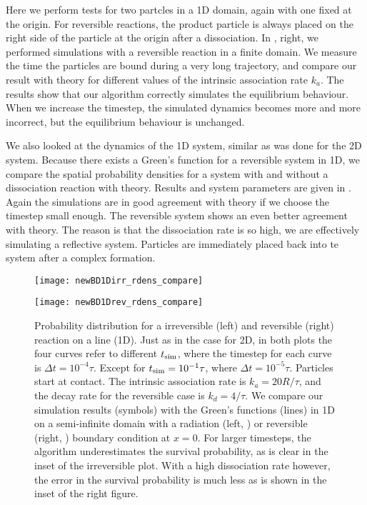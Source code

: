Here we perform tests for two partcles in a 1D domain, again with one fixed at the origin. For reversible reactions, the product particle is always placed on the right side of the particle at the origin after a dissociation. In , right, we performed simulations with a reversible reaction in a finite domain. We measure the time the particles are bound during a very long trajectory, and compare our result with theory for different values of the intrinsic association rate $k_a$. The results show that our algorithm correctly simulates the equilibrium behaviour. When we increase the timestep, the simulated dynamics becomes more and more incorrect, but the equilibrium behaviour is unchanged.

We also looked at the dynamics of the 1D system, similar as was done for the 2D system. Because there exists a Green's function for a reversible system in 1D, we compare the spatial probability densities for a system with and without a dissociation reaction with theory. Results and system parameters are given in . Again the simulations are in good agreement with theory if we choose the timestep small enough. The reversible system shows an even better agreement with theory. The reason is that the dissociation rate is so high, we are effectively simulating a reflective system. Particles are immediately placed back into te system after a complex formation.

\begin{figure}[hb]
\begin{minipage}[ht]{.5\linewidth}
\centering
\texttt{[image: newBD1Dirr\_rdens\_compare]}
\end{minipage}
\begin{minipage}[ht]{.5\linewidth}
\centering
\texttt{[image: newBD1Drev\_rdens\_compare]}
\end{minipage}
\caption{ Probability distribution for a irreversible (left) and reversible (right) reaction on a line (1D). Just as in the case for 2D, in both plots the four curves refer to different $t_{\rm sim}$, where the timestep for each curve is $\Delta t = 10^{-4} \tau$. Except for $t_{\rm sim}=10^{-1}\tau$, where $\Delta t=10^{-5}\tau$. Particles start at contact. The intrinsic association rate is $k_a=20 R/\tau$, and the decay rate for the reversible case is $k_d=4/\tau$. We compare our simulation results (symbols) with the Green's functions (lines) in 1D on a semi-infinite domain with a radiation (left, \cite{Beck1992}) or reversible (right, \cite{Agmon1984,Kim2001}) boundary condition at $x=0$. For larger timesteps, the algorithm underestimates the survival probability, as is clear in the inset of the irreversible plot. With a high dissociation rate however, the error in the survival probability is much less as is shown in the inset of the right figure.}
\end{figure}

